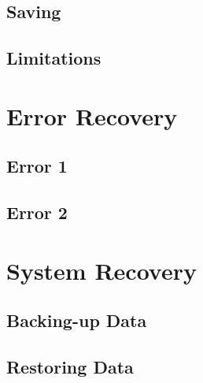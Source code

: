 \subsection{Saving}

\subsection{Limitations}

\section{Error Recovery}

\subsection{Error 1}

\subsection{Error 2}

\section{System Recovery}

\subsection{Backing-up Data}

\subsection{Restoring Data}